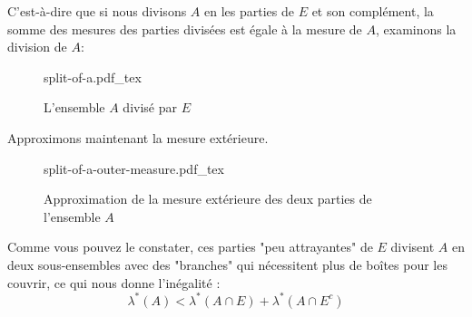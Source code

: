 \documentclass[a4paper]{article}
\newcommand{\incfig}[1]{%
    \def\svgwidth{\columnwidth}
    {#1.pdf_tex}
}
\begin{document}
C'est-à-dire que si nous divisons $A$ en les parties de $E$ et son complément, la somme des mesures des parties divisées est égale à la mesure de $A$, examinons la division de $A$:%
\begin{figure}[H]
    \centering
    \incfig{split-of-a}
    \caption{L'ensemble $A$ divisé par $E$}
    \label{fig:split-of-a}
\end{figure}%
Approximons maintenant la mesure extérieure.%
\begin{figure}[H]
    \centering
    \incfig{split-of-a-outer-measure}
    \caption{Approximation de la mesure extérieure des deux parties de l'ensemble $A$}
    \label{fig:split-of-a-outer-measure}
\end{figure}%
Comme vous pouvez le constater, ces parties "peu attrayantes" de $E$ divisent $A$ en deux sous-ensembles avec des "branches" qui nécessitent plus de boîtes pour les couvrir, ce qui nous donne l'inégalité :
 \[
\lambda^*(A) < \lambda^*(A \cap E) + \lambda^*(A \cap E^c)
\] 
\end{document}
